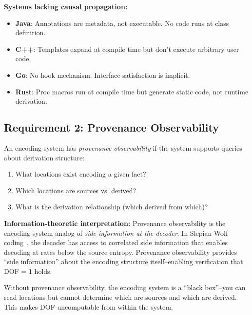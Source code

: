 \textbf{Systems lacking causal propagation:}
\begin{itemize}
\tightlist
\item \textbf{Java}: Annotations are metadata, not executable. No code runs at class definition.
\item \textbf{C++}: Templates expand at compile time but don't execute arbitrary user code.
\item \textbf{Go}: No hook mechanism. Interface satisfaction is implicit.
\item \textbf{Rust}: Proc macros run at compile time but generate static code, not runtime derivation.
\end{itemize}

\subsection{Requirement 2: Provenance Observability}\label{sec:provenance-observability}

\begin{definition}\label{def:provenance-observability}
An encoding system has \emph{provenance observability} if the system supports queries about derivation structure:
\begin{enumerate}
\tightlist
\item What locations exist encoding a given fact?
\item Which locations are sources vs. derived?
\item What is the derivation relationship (which derived from which)?
\end{enumerate}
\end{definition}

\textbf{Information-theoretic interpretation:} Provenance observability is the encoding-system analog of \emph{side information at the decoder}. In Slepian-Wolf coding~\cite{slepian1973noiseless}, the decoder has access to correlated side information that enables decoding at rates below the source entropy. Provenance observability provides ``side information'' about the encoding structure itself--enabling verification that DOF = 1 holds.

Without provenance observability, the encoding system is a ``black box''--you can read locations but cannot determine which are sources and which are derived. This makes DOF uncomputable from within the system.

